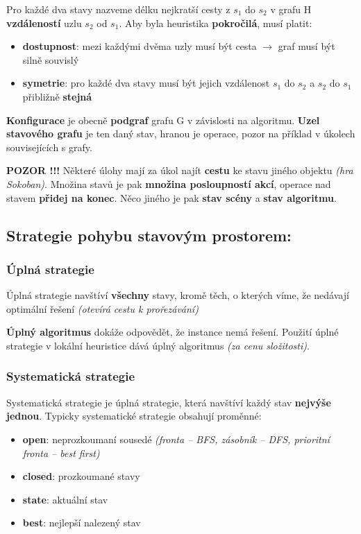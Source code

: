Pro každé dva stavy nazveme délku nejkratší cesty z $s_1$ do $s_2$ v grafu H \textbf{vzdáleností} uzlu $s_2$ od $s_1$. Aby byla heuristika \textbf{pokročilá}, musí platit:

\begin{itemize}
    \item \textbf{dostupnost}: mezi každými dvěma uzly musí být cesta $\to$ graf musí být silně souvislý
    \item \textbf{symetrie}: pro každé dva stavy musí být jejich vzdálenost $s_1$ do $s_2$ a $s_2$ do $s_1$ přibližně \textbf{stejná}
\end{itemize}

\textbf{Konfigurace} je obecně \textbf{podgraf} grafu G v závislosti na algoritmu. \textbf{Uzel stavového grafu} je ten daný stav, hranou je operace, pozor na příklad v úkolech souvisejících s grafy.

\textbf{POZOR !!!} Některé úlohy mají za úkol najít \textbf{cestu} ke stavu jiného objektu \textit{(hra Sokoban)}. Množina stavů je pak \textbf{množina posloupností akcí}, operace nad stavem \textbf{přidej na konec}. Něco jiného je pak \textbf{stav scény} a \textbf{stav algoritmu}.

\subsection{Strategie pohybu stavovým prostorem:}

\subsubsection{Úplná strategie}

Úplná strategie navštíví \textbf{všechny} stavy, kromě těch, o kterých víme, že nedávají optimální řešení \textit{(otevírá cestu k prořezávání)}

\textbf{Úplný algoritmus} dokáže odpovědět, že instance nemá řešení. Použití úplné strategie v lokální heuristice dává úplný algoritmus \textit{(za cenu složitosti)}.

\subsubsection{Systematická strategie}

Systematická strategie je úplná strategie, která navštíví každý stav \textbf{nejvýše jednou}. Typicky systematické strategie obsahují proměnné:

\begin{itemize}
    \item \textbf{open}: neprozkoumaní sousedé \textit{(fronta -- BFS, zásobník -- DFS, prioritní fronta -- best first)}
    \item \textbf{closed}: prozkoumané stavy
    \item \textbf{state}: aktuální stav
    \item \textbf{best}: nejlepší nalezený stav
\end{itemize}

